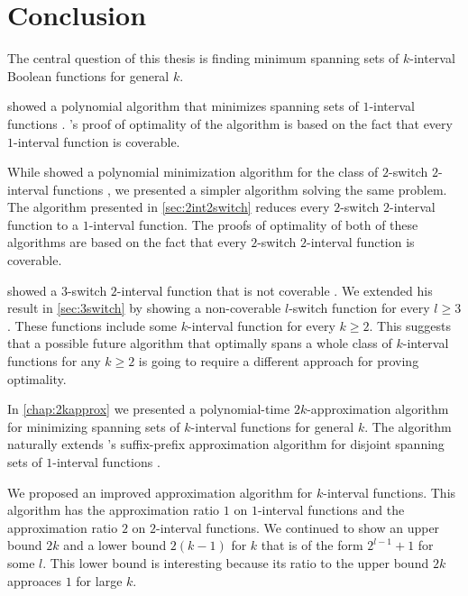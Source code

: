 \chapter*{Conclusion}


The central question of this thesis
is finding minimum spanning sets
of $k$-interval Boolean functions
for general $k$.

\citeauthor{Schieber2005154} showed a polynomial algorithm
that minimizes spanning sets of $1$-interval functions
\citep[Section 3]{Schieber2005154}.
\citeauthor{Schieber2005154}'s proof of optimality
of the algorithm
is based on the fact that every $1$-interval function
is coverable.

While \citeauthor{Dubovsky2012} showed
a polynomial minimization algorithm
for the class of $2$-switch $2$-interval functions
\citep[Section 4]{Dubovsky2012},
we presented a simpler algorithm
solving the same problem.
The algorithm presented in \cref{sec:2int2switch}
reduces every $2$-switch $2$-interval function
to a $1$-interval function.
The proofs of optimality of both of these algorithms
are based on the fact that every $2$-switch $2$-interval
function is coverable.

\citeauthor{Dubovsky2012} showed
a $3$-switch $2$-interval function
that is not coverable
\citep[p.~32]{Dubovsky2012}.
We extended his result
in \cref{sec:3switch}
by showing
a non-coverable $l$-switch function for every $l \geq 3$.
These functions include some $k$-interval function
for every $k \geq 2$.
This suggests that a possible future algorithm
that optimally spans a whole class
of $k$-interval functions
for any $k \geq 2$
is going to require a different approach
for proving optimality.

In \cref{chap:2kapprox}
we presented
a polynomial-time
$2k$-approximation algorithm
for minimizing spanning sets
of $k$-interval functions for general $k$.
The algorithm naturally extends
\citeauthor{Schieber2005154}'s suffix-prefix
approximation algorithm
for disjoint spanning sets of $1$-interval functions
\citep[Section 6]{Schieber2005154}.

We proposed an improved approximation algorithm
for $k$-interval functions.
This algorithm has the approximation ratio $1$
on $1$-interval functions
and the approximation ratio $2$
on $2$-interval functions.
We continued to show an upper bound $2k$
and a lower bound $2(k-1)$
for $k$ that is of the form $2^{l-1}+1$ for some $l$.
This lower bound is interesting
because its ratio to the upper bound $2k$ approaces $1$
for large $k$.

